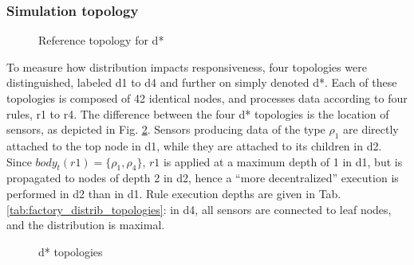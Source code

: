 \documentclass[sw]{iosart2x}
\begin{document}
\subsubsection{Simulation topology}

\begin{figure}
	\centering
	\caption{Reference topology for d*}
	\label{fig:factory_distrib_topologies}
	\scalebox{0.95}{
		
	}
\end{figure}

\begin{table}
	\centering
	\caption{Machines hosts for distribution experiments}
	\label{tab:distrib_hosts}
\end{table}

To measure how distribution impacts responsiveness, four topologies were distinguished, labeled d1 to d4 and further on simply denoted d*. Each of these topologies is composed of 42 identical nodes, and processes data according to four rules, r1 to r4.
The difference between the four d* topologies is the location of sensors, as depicted in Fig. \ref{fig:dstar}. 
Sensors producing data of the type $\rho_{1}$ are directly attached to the top node in d1, while they are attached to its children in d2. 
Since $body_t(r1)=\{\rho_{1}, \rho_{4}\}$, $r1$ is applied at a maximum depth of 1 in d1, but is propagated to nodes of depth 2 in d2, hence a ``more decentralized'' execution is performed in d2 than in d1.
Rule execution depths are given in Tab. \ref{tab:factory_distrib_topologies}: in d4, all sensors are connected to leaf nodes, and the distribution is maximal.

\begin{figure}
	\centering
	\caption{d* topologies}
	\label{fig:dstar}
	\scalebox{0.75}{
		
	}
	
	\centering
	\scalebox{0.75}{
		
	}
	
%	
\end{figure}
\end{document}

